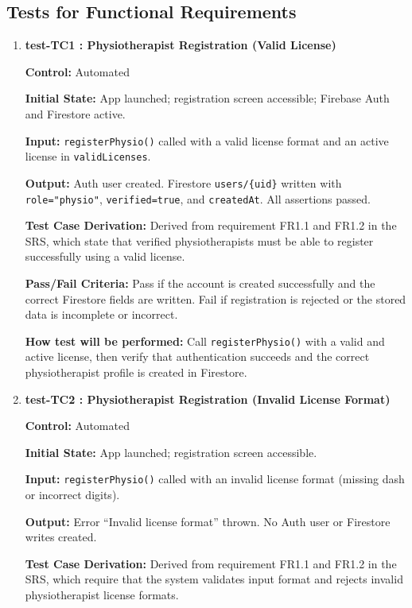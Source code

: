 \documentclass[12pt, titlepage]{article}
\begin{document}
\subsection{Tests for Functional Requirements} 


\begin{enumerate}
	
	\item \textbf{test-TC1 : Physiotherapist Registration (Valid License)}
	
	\textbf{Control:} Automated
	
	\textbf{Initial State:} App launched; registration screen accessible; Firebase Auth and Firestore active.
	
	\textbf{Input:} \texttt{registerPhysio()} called with a valid license format and an active license in \texttt{validLicenses}.
	
	\textbf{Output:} Auth user created. Firestore \texttt{users/\{uid\}} written with \texttt{role="physio"}, \texttt{verified=true}, and \texttt{createdAt}. All assertions passed.
	
	\textbf{Test Case Derivation:} Derived from requirement FR1.1 and FR1.2 in the SRS, which state that verified physiotherapists must be able to register successfully using a valid license.

	\textbf{Pass/Fail Criteria:} Pass if the account is created successfully and the correct Firestore fields are written. Fail if registration is rejected or the stored data is incomplete or incorrect.
	
	\textbf{How test will be performed:} Call \texttt{registerPhysio()} with a valid and active license, then verify that authentication succeeds and the correct physiotherapist profile is created in Firestore.
	
	
	\vspace{0.5em}
	
	\item \textbf{test-TC2 : Physiotherapist Registration (Invalid License Format)}
	
	\textbf{Control:} Automated
	
	\textbf{Initial State:} App launched; registration screen accessible.
	
	\textbf{Input:} \texttt{registerPhysio()} called with an invalid license format (missing dash or incorrect digits).
	
	\textbf{Output:} Error ``Invalid license format'' thrown. No Auth user or Firestore writes created.
	
	\textbf{Test Case Derivation:} Derived from requirement FR1.1 and FR1.2 in the SRS, which require that the system validates input format and rejects invalid physiotherapist license formats.
	

\end{enumerate}
\end{document}
